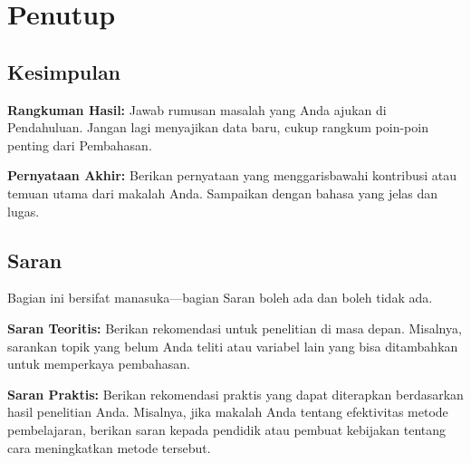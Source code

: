 %
%
\chapter{Penutup}


%
%
\section{Kesimpulan}

\textbf{Rangkuman Hasil:} Jawab rumusan masalah yang Anda ajukan di Pendahuluan. Jangan lagi menyajikan data baru, cukup rangkum poin-poin penting dari Pembahasan.

\textbf{Pernyataan Akhir:} Berikan pernyataan yang menggarisbawahi kontribusi atau temuan utama dari makalah Anda. Sampaikan dengan bahasa yang jelas dan lugas.

%
%
\section{Saran}

Bagian ini bersifat manasuka---bagian Saran boleh ada dan boleh tidak ada.

\textbf{Saran Teoritis:} Berikan rekomendasi untuk penelitian di masa depan. Misalnya, sarankan topik yang belum Anda teliti atau variabel lain yang bisa ditambahkan untuk memperkaya pembahasan.

\textbf{Saran Praktis:} Berikan rekomendasi praktis yang dapat diterapkan berdasarkan hasil penelitian Anda. Misalnya, jika makalah Anda tentang efektivitas metode pembelajaran, berikan saran kepada pendidik atau pembuat kebijakan tentang cara meningkatkan metode tersebut.
